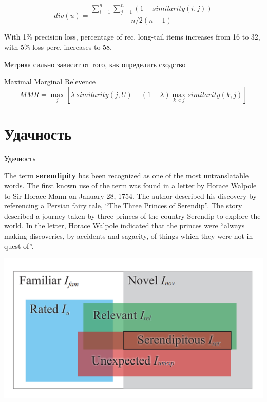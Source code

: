 \documentclass[11pt,aspectratio=169,handout]{beamer}
\begin{document}
\begin{frame}

\[
div(u) = \frac{\sum_{i=1}^n \sum_{j=1}^n (1 - similarity(i, j))}{n/2 (n-1)} 
\]

\vfill

\begin{tcolorbox}[colback=gray!5,colframe=gray!80,title=]
With 1\% precision loss, percentage of rec. long-tail items increases from 16 to 32, with 5\% loss perc. increases to 58.
\end{tcolorbox}

\vfill

\begin{tcolorbox}[colback=warn!5,colframe=warn!80,title=]
Метрика сильно зависит от того, как определить сходство
\end{tcolorbox}

\end{frame}

\begin{frame}
Maximal Marginal Relevence \cite{CARBONELL}
\[
MMR = \max_j \left[ \lambda \, similarity(j, U) - (1 - \lambda) \max_{k < j} similarity(k, j) \right]
\]
\end{frame}

\section{Удачность}

\begin{frame}{Удачность}

The term {\bf serendipity} has been recognized as one of the most untranslatable words. 
The first known use of the term was found in a letter by Horace Walpole to Sir Horace Mann on January 28, 1754. 
The author described his discovery by referencing a Persian fairy tale, ``The Three Princes of Serendip''. 
The story described a journey taken by three princes of the country Serendip to explore the world. 
In the letter, Horace Walpole indicated that the princes were ``always making discoveries, by accidents and sagacity, of things which they were not in quest of''. \cite{KOTKOV}

\begin{center}
\includegraphics[scale=0.3]{images/serendipity.png}
\end{center}

\end{frame}
\end{document}
